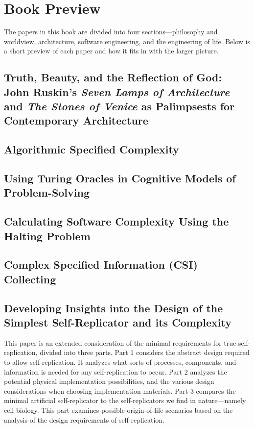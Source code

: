 \section{Book Preview}

The papers in this book are divided into four sections---philosophy and worldview, architecture, software engineering, and the engineering of life.  Below is a short preview of each paper and how it fits in with the larger picture.

\subsection*{Truth, Beauty, and the Reflection of God: John Ruskin's \textit{Seven Lamps of Architecture} and \textit{The Stones of Venice} as Palimpsests for Contemporary Architecture}

\subsection*{Algorithmic Specified Complexity}

\subsection*{Using Turing Oracles in Cognitive Models of Problem-Solving}

\subsection*{Calculating Software Complexity Using the Halting Problem}

\subsection*{Complex Specified Information (CSI) Collecting}

\subsection*{Developing Insights into the Design of the Simplest Self-Replicator and its Complexity}

This paper is an extended consideration of the minimal requirements for true self-replication, divided
into three parts.  Part 1 considers the abstract design required to allow self-replication.  It analyzes
what sorts of processes, components, and information is needed for any self-replication to occur.  
Part 2 analyzes the potential physical implementation possibilities, and the various design considerations
when choosing implementation materials.  Part 3 compares the minimal artificial self-replicator to 
the self-replicators we find in nature---namely cell biology.  This part examines possible origin-of-life
scenarios based on the analysis of the design requirements of self-replication.




